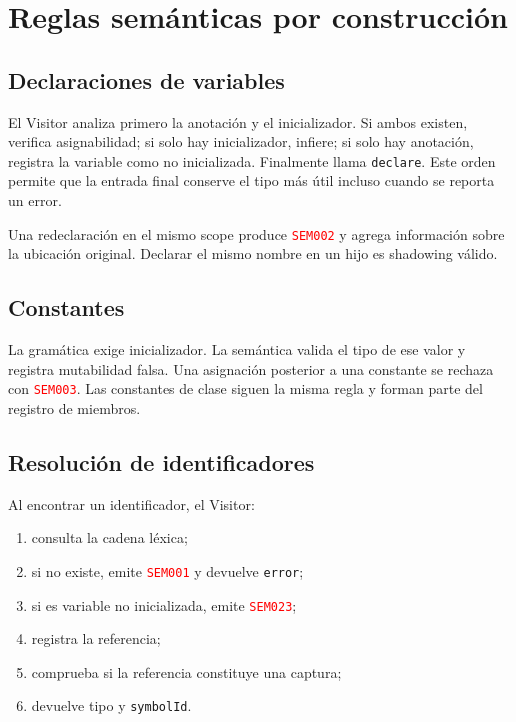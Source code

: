 \documentclass[11pt,letterpaper,oneside]{report}
\newcommand{\codigo}[1]{\texttt{#1}}
\newcommand{\diag}[1]{\textcolor{red}{\texttt{#1}}}
\begin{document}
\chapter{Reglas semánticas por construcción}

\section{Declaraciones de variables}

El Visitor analiza primero la anotación y el inicializador. Si ambos existen, verifica
asignabilidad; si solo hay inicializador, infiere; si solo hay anotación, registra la
variable como no inicializada. Finalmente llama \codigo{declare}. Este orden permite
que la entrada final conserve el tipo más útil incluso cuando se reporta un error.

Una redeclaración en el mismo scope produce \diag{SEM002} y agrega información sobre
la ubicación original. Declarar el mismo nombre en un hijo es shadowing válido.

\section{Constantes}

La gramática exige inicializador. La semántica valida el tipo de ese valor y registra
mutabilidad falsa. Una asignación posterior a una constante se rechaza con
\diag{SEM003}. Las constantes de clase siguen la misma regla y forman parte del
registro de miembros.

\section{Resolución de identificadores}

Al encontrar un identificador, el Visitor:

\begin{enumerate}
  \item consulta la cadena léxica;
  \item si no existe, emite \diag{SEM001} y devuelve \codigo{error};
  \item si es variable no inicializada, emite \diag{SEM023};
  \item registra la referencia;
  \item comprueba si la referencia constituye una captura;
  \item devuelve tipo y \codigo{symbolId}.
\end{enumerate}
\end{document}
